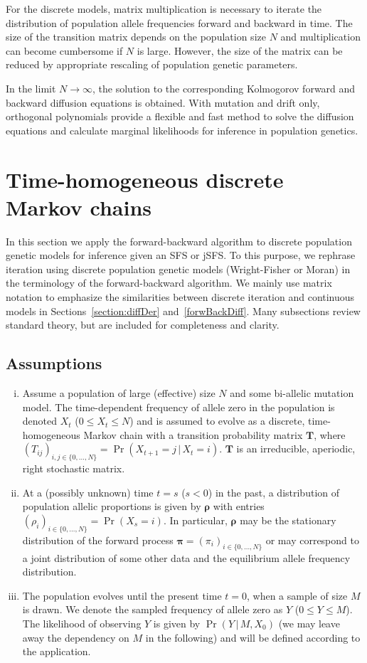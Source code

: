 \documentclass[preprint]{elsarticle}
\newcommand{\bs}[1]{\ensuremath{\boldsymbol{#1}}}
\newcommand\given{{\,|\,}}
\newcommand\x[1]{\ensuremath{X_{#1}}}
\newcommand\y{\ensuremath{Y}}
\newcommand\s{\ensuremath{s}}
\begin{document}
For the discrete models, matrix multiplication is necessary to iterate the distribution of population allele frequencies forward and backward in time. The size of the transition matrix depends on the population size $N$ and multiplication can become cumbersome if $N$ is large. However, the size of the matrix can be reduced by appropriate rescaling of population genetic parameters.

In the limit $N\to\infty$, the solution to the corresponding Kolmogorov forward and backward diffusion equations is obtained. With mutation and drift only, orthogonal polynomials provide a flexible and fast method to solve the diffusion equations and calculate marginal likelihoods for inference in population genetics.

\section{Time-homogeneous discrete Markov chains}

In this section we apply the forward-backward algorithm to discrete population genetic models for inference given an SFS or jSFS. To this purpose, we rephrase iteration using discrete population genetic models (Wright-Fisher or Moran) in the terminology of the forward-backward algorithm. We mainly use matrix notation to emphasize the similarities between discrete iteration and continuous models in Sections~\ref{section:diffDer} and~\ref{forwBackDiff}. Many subsections review standard theory, but are included for completeness and clarity. 

\subsection{Assumptions}\label{section:assumptions}
\begin{enumerate}[(i)]
\item Assume a population of large (effective) size $N$ and some bi-allelic mutation model. The time-dependent frequency of allele zero in the population is denoted $\x{t}$ ($0 \le \x{t} \le N$) and is assumed to evolve as a discrete, time-homogeneous Markov chain with a transition probability matrix $\mathbf{T}$, where $(T_{ij})_{i,j \in \{0, \ldots, N\}} = \Pr(\x{t+1}=j \given \x{t}=i)$. $\mathbf{T}$ is an irreducible, aperiodic, right stochastic matrix.
\item At a (possibly unknown) time $t=\s$ ($\s<0$) in the past, a distribution of population allelic proportions is given by $\bs{\rho}$ with entries $(\rho_{i})_{i \in \{0, \ldots, N\}} = \Pr(\x{\s}=i)$.  In particular, $\bs{\rho}$ may be the stationary distribution of the forward process $\bs{\pi}=(\pi_i)_{i \in \{0, \ldots, N\}}$ or may correspond to a joint distribution of some other data and the equilibrium allele frequency distribution. 
\item The population evolves until the present time $t=0$, when a sample of size $M$ is drawn.  We denote the sampled frequency of allele zero as $\y$ ($0 \le \y \le M$). The likelihood of observing $\y$ is given by $\Pr(\y \given M, \x{0})$ (we may leave away the dependency on $M$ in the following) and will be defined according to the application.
\end{enumerate}
\end{document}

